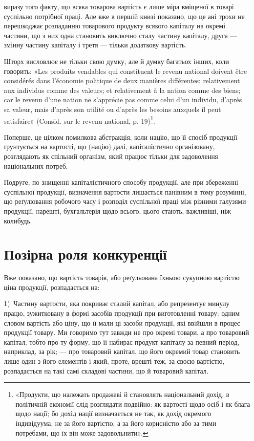 \parcont{}  %
виразу того факту, що всяка товарова вартість є лише міра вміщеної в товарі
суспільно потрібної праці. Але вже в першій книзі показано, що це ані трохи
не перешкоджає розпаданню товарового продукту всякого капіталу на окремі
частини, що з них одна становить виключно сталу частину капіталу, друга —
змінну частину капіталу і третя — тільки додаткову вартість.

Шторх висловлює не тільки свою думку, але й думку багатьох інших,
коли говорить: «Les produits vendables qui constituent le revenu national doivent
être considérés dans l’économie politique de deux manières différentes: relativement aux
individus comme des valeurs; et relativement à la nation comme des biens; car le
revenu d’une nation ne s’apprécie pas comme celui d’un individu, d’après sa valeur,
mais d’après son utilité ou d’après les besoins auxquels il peut satisfaire» (Consid.
sur le revenu national, p. 19)\footnote*{
«Продукти, що належать продажеві й становлять національний дохід, в політичній економії слід
розглядати подвійно: як вартості щодо осіб і як блага щодо нації; бо дохід нації визначається не
так, як дохід окремого індивідуума, не за його вартістю, а за його корисністю або за тими потребами,
що їх він може задовольнити».
}.

Поперше, це цілком помилкова абстракція, коли націю, що її спосіб продукції
ґрунтується на вартості, що (націю) далі, капіталістично організовану,
розглядають як спільний організм, який працює тільки для задоволення національних
потреб.

Подруге, по знищенні капіталістичного способу продукції, але при збереженні
суспільної продукції, визначення вартости лишається панівним в тому
розумінні, що реґулювання робочого часу і розподіл суспільної праці між різними
галузями продукції, нарешті, бухгальтерія щодо всього, цього стають,
важливіші, ніж колибудь.

\section{Позірна роля конкуренції}

Вже показано, що вартість товарів, або реґульована їхньою сукупною вартістю
ціна продукції, розпадається на:

1)~Частину вартости, яка покриває сталий капітал, або репрезентує минулу
працю, зужитковану в формі засобів продукції при виготовленні товару; одним
словом вартість або ціну, що її мали ці засоби продукції, які ввійшли в процес
продукції товару. Ми говоримо тут завжди не про окремі товари, а про товаровий
капітал, тобто про ту форму, що її набирає продукт капіталу за певний
період, наприклад, за рік; — про товаровий капітал, що його окремий товар
становить лише один з його елементів і який, проте, врешті теж, за своєю
вартістю, розпадається на такі самі складові частини, що й товаровий капітал.

